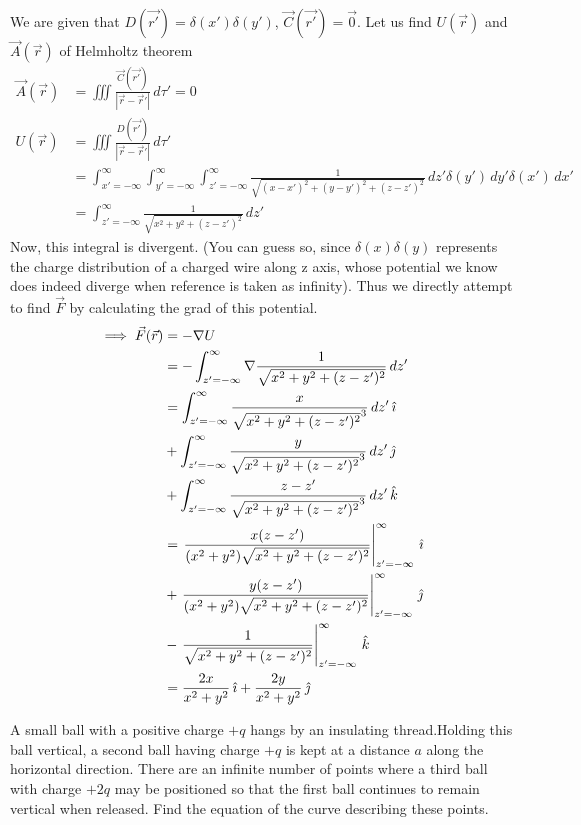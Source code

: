 \documentclass[../main.tex]{subfiles}
\begin{document}
\begin{questions}
\begin{solution}
	We are given that $D(\vec{r'}) = \delta(x')\delta(y')$, $\vec{C}(\vec{r'})=\vec{0}$. Let us find $U(\vec{r})$ and $\vec{A}(\vec{r})$ of Helmholtz theorem
	\begin{align}
		\vec{A}(\vec{r}) &= \iiint \frac{\vec{C}(\vec{r'})}{|\vec{r}-\vec{r}'|}\,d\tau'= 0
	\\
		U(\vec{r}) &= \iiint \frac{D(\vec{r'})}{|\vec{r}-\vec{r}'|}\,d\tau'
	\\
		&= \int_{x'=-\infty}^{\infty}\int_{y'=-\infty}^{\infty}\int_{z'=-\infty}^{\infty} \frac{1}{\sqrt{(x-x')^2+(y-y')^2+(z-z')^2}}\,dz'\delta(y')\,dy'\delta(x')\,dx'
	\\
		&= \int_{z'=-\infty}^{\infty} \frac{1}{\sqrt{x^2+y^2+(z-z')^2}}\,dz'
	\end{align}
	Now, this integral is divergent. (You can guess so, since $\delta(x)\delta(y)$ represents the charge distribution of a charged wire along z axis, whose potential we know does indeed diverge when reference is taken as infinity). Thus we directly attempt to find $\vec{F}$ by calculating the grad of this potential.
	\begin{align}
		\implies \vec{F}(\vec{r}) &= -\nabla U
	\\
		&= -\int_{z'=-\infty}^{\infty} \nabla\frac{1}{\sqrt{x^2+y^2+(z-z')^2}}\,dz'
	\\
		&= \int_{z'=-\infty}^{\infty} \frac{x}{\sqrt{x^2+y^2+(z-z')^2}^3}\,dz'\,\ihat
	\\
		&+ \int_{z'=-\infty}^{\infty} \frac{y}{\sqrt{x^2+y^2+(z-z')^2}^3}\,dz'\,\jhat
	\\
		&+ \int_{z'=-\infty}^{\infty} \frac{z-z'}{\sqrt{x^2+y^2+(z-z')^2}^3}\,dz'\,\khat
	\\
		&= \left.\frac{x(z-z')}{(x^2+y^2)\sqrt{x^2+y^2+(z-z')^2}}\right|_{z'=-\infty}^{\infty}\,\ihat
	\\
		&+ \left.\frac{y(z-z')}{(x^2+y^2)\sqrt{x^2+y^2+(z-z')^2}}\right|_{z'=-\infty}^{\infty}\,\jhat
	\\
		&- \left.\frac{1}{\sqrt{x^2+y^2+(z-z')^2}}\right|_{z'=-\infty}^{\infty}\,\khat
	\\
		&= \frac{2x}{x^2+y^2}\,\ihat + \frac{2y}{x^2+y^2}\,\jhat
	\end{align}
\end{solution}

\question A small ball with a positive charge $+q$ hangs by an insulating thread.Holding this ball vertical, a second ball having charge $+q$ is kept at a distance $a$ along the horizontal direction. There are an infinite number of points where a third ball with charge $+2q$ may be positioned so that the first ball continues to remain vertical when released. Find the equation of the curve describing these points.
\begin{solution}
	\begin{center}
		\begin{tikzpicture}


\end{tikzpicture}
\end{center}
\end{solution}
\end{questions}
\end{document}

